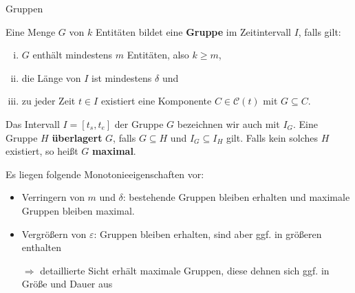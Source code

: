\documentclass[
wide,
10pt,
xcolor={x11names,svgnames},
hyperref={pdfauthor={Jannes Bantje},colorlinks,urlcolor=maincolor,hidelinks=false,linkcolor=maincolor},
pantone312, 	%
euler-digits,
]{beamer}
\newcommand{\Index}[1]{\bet{#1}}
\newcommand{\bet}[1]{\textbf{\color{maincolor}#1}}
\theoremstyle{definition}
\begin{document}
\begin{frame}{Gruppen}
    \begin{definition}[Gruppe]
    	Eine Menge $G$ von $k$ Entitäten bildet eine \Index{Gruppe} im Zeitintervall $I$, falls gilt:
    	\begin{enumerate}[(i)]
    		\item $G$ enthält mindestens $m$ Entitäten, also $k \ge m$,
    		\item die Länge von $I$ ist mindestens $\delta$ und
    		\item zu jeder Zeit $t \in I$ existiert eine Komponente $C \in \mathcal{C}(t)$ mit $G \subseteq C$.
    	\end{enumerate}
    	Das Intervall $I=[t_s,t_e]$ der Gruppe $G$ bezeichnen wir auch mit $I_G$.
    	Eine Gruppe $H$ \bet{überlagert} $G$, falls $G \subseteq H$ und $I_G \subseteq I_H$ gilt.
    	Falls kein solches $H$ existiert, so heißt $G$ \bet{maximal}.
    \end{definition}\pause
    Es liegen folgende Monotonieeigenschaften vor:\pause
    \begin{itemize}[<+->]
        \item Verringern von $m$ und $\delta$: bestehende Gruppen bleiben erhalten und maximale Gruppen bleiben maximal.
        \item Vergrößern von $\varepsilon$:
        Gruppen bleiben erhalten, sind aber ggf. in größeren enthalten
        \item[$\Rightarrow$] detaillierte Sicht erhält maximale Gruppen, diese dehnen sich ggf. in Größe und Dauer aus
    \end{itemize}
\end{frame}
\end{document}
